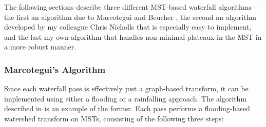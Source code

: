 The following sections describe three different MST-based waterfall algorithms -- the first an algorithm due to Marcotegui and Beucher \cite{marcotegui05}, the second an algorithm developed by my colleague Chris Nicholls \cite{nicholls09} that is especially easy to implement, and the last my own algorithm that handles non-minimal plateaux in the MST in a more robust manner.

\subsubsection{Marcotegui's Algorithm}


Since each waterfall pass is effectively just a graph-based  transform, it can be implemented using either a flooding or a rainfalling approach. The algorithm described in \cite{marcotegui05} is an example of the former. Each pass performs a flooding-based watershed transform on MSTs, consisting of the following three steps:

